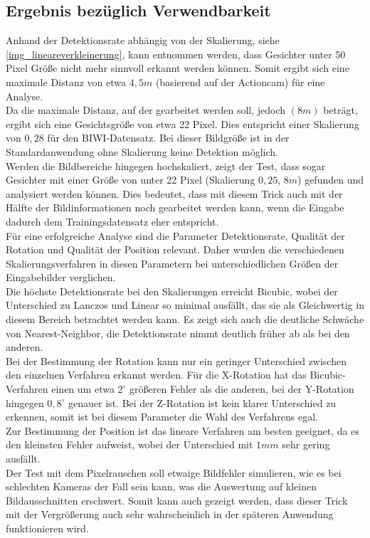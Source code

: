 \subsection{Ergebnis bezüglich Verwendbarkeit}
Anhand der Detektionsrate abhängig von der Skalierung, siehe \autoref{img_lineareverkleinerung}, kann entnommen werden, dass Gesichter unter 50 Pixel Größe nicht mehr sinnvoll erkannt werden können. Somit ergibt sich eine maximale Distanz von etwa $4,5m$ (basierend auf der Actioncam) für eine Analyse.\\
Da die maximale Distanz, auf der gearbeitet werden soll, jedoch $(8m)$ beträgt, ergibt sich eine Gesichtsgröße von etwa 22 Pixel. Dies entspricht einer Skalierung von $0,28$ für den BIWI-Datensatz. Bei dieser Bildgröße ist in der Standardanwendung ohne Skalierung keine Detektion möglich.\\
Werden die Bildbereiche hingegen hochskaliert, zeigt der Test, dass sogar Gesichter mit einer Größe von unter 22 Pixel (Skalierung $0,25$, $8m$) gefunden und analysiert werden können. Dies bedeutet, dass mit diesem Trick auch mit der Hälfte der Bildinformationen noch gearbeitet werden kann, wenn die Eingabe dadurch dem Trainingsdatensatz eher entspricht.\\
Für eine erfolgreiche Analyse sind die Parameter Detektionsrate, Qualität der Rotation und Qualität der Position relevant. Daher wurden die verschiedenen Skalierungsverfahren in diesen Parametern bei unterschiedlichen Größen der Eingabebilder verglichen.\\
Die höchste Detektionsrate bei den Skalierungen erreicht Bicubic, wobei der Unterschied zu Lanczos und Linear so minimal ausfällt, das sie als Gleichwertig in diesem Bereich betrachtet werden kann. Es zeigt sich auch die deutliche Schwäche von Nearest-Neighbor, die Detektionsrate nimmt deutlich früher ab als bei den anderen.\\
Bei der Bestimmung der Rotation kann nur ein geringer Unterschied zwischen den einzelnen Verfahren erkannt werden. Für die X-Rotation hat das Bicubic-Verfahren einen um etwa $2^\circ$ größeren Fehler als die anderen, bei der Y-Rotation hingegen $0,8^\circ$ genauer ist. Bei der Z-Rotation ist kein klarer Unterschied zu erkennen, somit ist bei diesem Parameter die Wahl des Verfahrens egal.\\
Zur Bestimmung der Position ist das lineare Verfahren am besten geeignet, da es den kleinsten Fehler aufweist, wobei der Unterschied mit $1mm$ sehr gering ausfällt.\\
Der Test mit dem Pixelrauschen soll etwaige Bildfehler simulieren, wie es bei schlechten Kameras der Fall sein kann, was die Auswertung auf kleinen Bildausschnitten erschwert. Somit kann auch gezeigt werden, dass dieser Trick mit der Vergrößerung auch sehr wahrscheinlich in der späteren Anwendung funktionieren wird.
